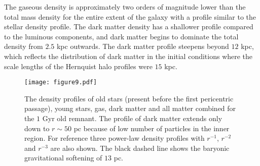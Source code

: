 \documentclass[a4paper,fleqn,usenatbib]{mnras}
\begin{document}
The gaseous density
is approximately two orders of magnitude lower than the total mass density for the entire extent of the galaxy
with a profile similar to the stellar density profile.
The dark matter density has a shallower profile compared to the luminous components, and dark matter
begins to dominate the total density from $2.5$ kpc outwards. The dark matter profile steepens beyond $12$ kpc,
which reflects the distribution of dark matter in the initial conditions where the scale lengths of the Hernquist 
halo profiles were $15$ kpc. 

\begin{figure}
\texttt{[image: figure9.pdf]}
    \caption{The density profiles of old stars (present before the first pericentric passage),
    young stars, gas, dark matter and all matter combined for the $1$ Gyr old 
    remnant. The profile of dark matter extends only down to $r\sim50$ pc because of low number of particles in the inner region.
    For reference three power-law density profiles with $r^{-1}$, $r^{-2}$ and $r^{-3}$ are also 
    shown. The black dashed line shows the baryonic gravitational
    softening of $13$ pc.}
    \label{fig:density}
\end{figure}
\end{document}
